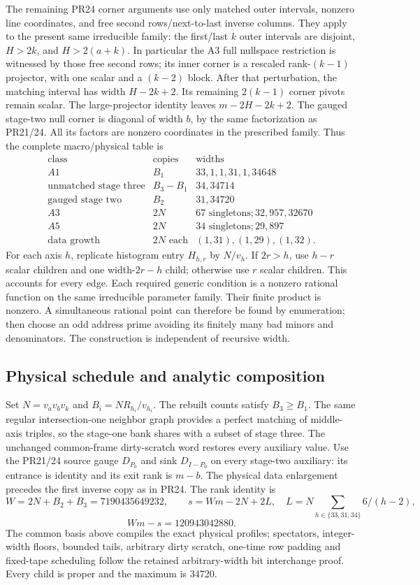 The remaining PR24 corner arguments use only matched outer intervals,
nonzero line coordinates, and free second rows/next-to-last inverse columns.
They apply to the present same irreducible family: the first/last $k$
outer intervals are disjoint, $H>2k$, and $H>2(a+k)$. In particular the
A3 full nullspace restriction is witnessed by those free second rows;
its inner corner is a rescaled rank-$(k-1)$ projector, with one scalar
and a $(k-2)$ block. After that perturbation, the matching interval has
width $H-2k+2$. Its remaining $2(k-1)$ corner pivots remain scalar.
The large-projector identity leaves $m-2H-2k+2$.
The gauged stage-two null corner is diagonal of width $b$, by the same
factorization as PR21/24. All its factors are nonzero coordinates in
the prescribed family. Thus the complete macro/physical table is
\[
\begin{array}{c|c|l}
\text{class}&\text{copies}&\text{widths}\\\hline
A1&B_1&33,1,1,31,1,34648\\
\text{unmatched stage three}&B_3-B_1&34,34714\\
\text{gauged stage two}&B_2&31,34720\\
A3&2N&67\text{ singletons};32,957,32670\\
A5&2N&34\text{ singletons};29,897\\
\text{data growth}&2N\text{ each}&(1,31),(1,29),(1,32).
\end{array}
\]
For each axis $h$, replicate histogram entry $H_{h,r}$ by $N/v_h$.
If $2r>h$, use $h-r$ scalar children and one width-$2r-h$ child;
otherwise use $r$ scalar children. This accounts for every edge.
Each required generic condition is a nonzero rational function on the
same irreducible parameter family. Their finite product is nonzero.
A simultaneous rational point can therefore be found by enumeration;
then choose an odd address prime avoiding its finitely many bad minors
and denominators. The construction is independent of recursive width.

\subsection{Physical schedule and analytic composition}
Set $N=v_av_bv_k$ and $B_i=NR_{h_i}/v_{h_i}$.
The rebuilt counts satisfy $B_3\ge B_1$. The same regular intersection-one
neighbor graph provides a perfect matching of middle-axis triples,
so the stage-one bank shares with a subset of stage three. The unchanged
common-frame dirty-scratch word restores every auxiliary value.
Use the PR21/24 source gauge $D_{P_0}$ and sink $D_{I-P_0}$ on every
stage-two auxiliary: its entrance is identity and its exit rank is $m-b$.
The physical data enlargement precedes the first inverse copy as in PR24.
The rank identity is
\[
 W=2N+B_2+B_3=7190435649232,\qquad
 s=Wm-2N+2L,\quad L=N\sum_{h\in\{33,31,34\}}6/(h-2),
\]
\[
 Wm-s=120943042880.
\]
The common basis above compiles the exact physical profiles; spectators,
integer-width floors, bounded tails, arbitrary dirty scratch, one-time
row padding and fixed-tape scheduling follow the retained arbitrary-width
bit interchange proof. Every child is proper and the maximum is 34720.

